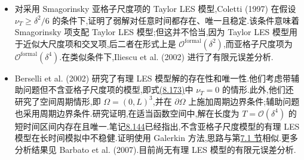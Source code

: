 \begin{note}[分析结果]
\label{note:les-wave-number-analytical-results}
\begin{itemize}
 \item 对采用 Smagorinsky 亚格子尺度项的 Taylor LES 模型,Coletti (1997) 在假设 $\nu_T\ge\delta^2/6$ 的条件下,证明了弱解对任意时间都存在、唯一且稳定.该条件意味着 Smagorinsky 项支配 Taylor LES 模型;但这并不恰当,因为 Taylor LES 模型用于近似大尺度项和交叉项,后二者在形式上是 $\mathcal{O}^{\mathrm{formal}}(\delta^2)$,而亚格子尺度项为 $\mathcal{O}^{\mathrm{formal}}(\delta^4)$.在类似条件下,Iliescu et al. (2002) 进行了有限元误差分析.
 \item Berselli et al. (2002) 研究了有理 LES 模型解的存在性和唯一性.他们考虑带辅助问题但不含亚格子尺度项的模型,即式\hyperref[eq:les-wave-number-model]{(8.173)}中 $\nu_T=0$ 的情形.此外,他们还研究了空间周期情形,即 $\Omega=(0,L)^3$,并在 $\partial\Omega$ 上施加周期边界条件;辅助问题也采用周期边界条件.研究证明,在适当函数空间中,解在长度为 $T=\mathcal{O}(\delta^4)$ 的短时间区间内存在且唯一.笔记\hyperref[note:les-second-order-fourier-sgs-term]{8.144}已经指出,不含亚格子尺度模型的有理 LES 模型在长时间模拟中不稳健.证明使用 Galerkin 方法,思路与第\hyperref[sec:time-dependent-ns-continuous]{7.1 节}相似.更多分析结果见 Barbato et al. (2007).目前尚无有理 LES 模型的有限元误差分析.
\end{itemize}
\end{note}

